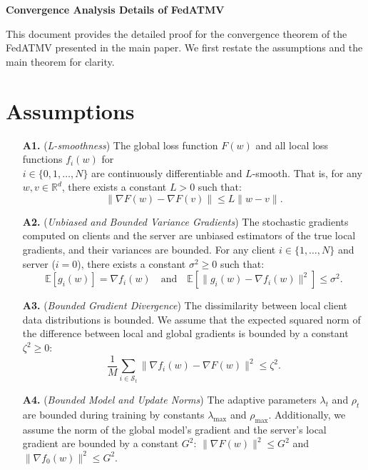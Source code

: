 \documentclass[11pt]{article}
\begin{document}
\begin{center}
	{\huge \bfseries Convergence Analysis Details of FedATMV}\\[1cm] 
\end{center}



This document provides the detailed proof for the convergence theorem of the FedATMV presented in the main paper. We first restate the assumptions and the main theorem for clarity.



\section{Assumptions}
\begin{itemize}
    \item[\textbf{A1.}] (\textit{L-smoothness}) The global loss function $F(w)$ and all local loss functions $f_i(w)$ for \\$i \in \{0, 1, \dots, N\}$ are continuously differentiable and $L$-smooth. That is, for any $w, v \in \mathbb{R}^d$, there exists a constant $L > 0$ such that:
    \begin{equation}
        \|\nabla F(w) - \nabla F(v)\| \le L \|w - v\|.
    \end{equation}
    
    \item[\textbf{A2.}] (\textit{Unbiased and Bounded Variance Gradients}) The stochastic gradients computed on clients and the server are unbiased estimators of the true local gradients, and their variances are bounded. For any client $i \in \{1, \dots, N\}$ and server ($i=0$), there exists a constant $\sigma^2 \ge 0$ such that:
    \begin{equation}
        \mathbb{E}[g_i(w)] = \nabla f_i(w) \quad \text{and} \quad \mathbb{E}[\|g_i(w) - \nabla f_i(w)\|^2] \le \sigma^2.
    \end{equation}
    
    \item[\textbf{A3.}] (\textit{Bounded Gradient Divergence}) The dissimilarity between local client data distributions is bounded. We assume that the expected squared norm of the difference between local and global gradients is bounded by a constant $\zeta^2 \ge 0$:
    \begin{equation}
        \frac{1}{M} \sum_{i \in \mathcal{S}_t} \|\nabla f_i(w) - \nabla F(w)\|^2 \le \zeta^2.
    \end{equation}
    
    \item[\textbf{A4.}] (\textit{Bounded Model and Update Norms}) The adaptive parameters $\lambda_t$ and $\rho_t$ are bounded during training by constants $\lambda_{\max}$ and $\rho_{\max}$. Additionally, we assume the norm of the global model's gradient and the server's local gradient are bounded by a constant $G^2$: $\|\nabla F(w)\|^2 \le G^2$ and $\|\nabla f_0(w)\|^2 \le G^2$.
\end{itemize}
\end{document}
